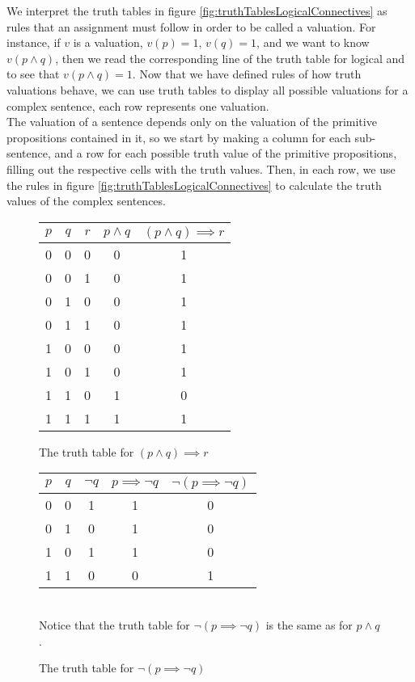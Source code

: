 \documentclass[11pt]{article}
\begin{document}
We interpret the truth tables in figure \ref{fig:truthTablesLogicalConnectives} as rules that an assignment must follow in order to be called a valuation. For instance, if $v$ is a valuation, $v(p) = 1$, $v(q) = 1$, and we want to know $v(p \land q)$, then we read the corresponding line of the truth table for logical and to see that $v(p \land q) = 1$.
\pagebreak
Now that we have defined rules of how truth valuations behave, we can use truth tables to display all possible valuations for a complex sentence, each row represents one valuation. \\ The valuation of a sentence depends only on the valuation of the primitive propositions contained in it, so we start by making a column for each sub-sentence, and a row for each possible truth value of the primitive propositions, filling out the respective cells with the truth values. Then, in each row, we use the rules in figure \ref{fig:truthTablesLogicalConnectives} to calculate the truth values of the complex sentences.
\begin{figure}[H]
    \caption{The truth table for $(p \wedge q) \implies r$}
    \label{fig:TruthTableEg1}
    \centering
    \begin{tabular}{|c|c|c|c|c|}
        \hline
        $p$ & $q$ & $r$ & $p \wedge q$ & $(p \wedge q) \implies r $\\ \hline
        0 & 0 & 0 & 0 & 1 \\
        0 & 0 & 1 & 0 & 1 \\
        0 & 1 & 0 & 0 & 1 \\
        0 & 1 & 1 & 0 & 1 \\
        1 & 0 & 0 & 0 & 1 \\
        1 & 0 & 1 & 0 & 1 \\
        1 & 1 & 0 & 1 & 0 \\
        1 & 1 & 1 & 1 & 1 \\ \hline
    \end{tabular}
\end{figure}
\begin{figure}[H]
    \caption{The truth table for $\neg(p \implies \neg q)$}
    \label{fig:TruthTableEg2}
    \centering
    \begin{tabular}{|c|c|c|c|c|}
        \hline
        $p$ & $q$ & $\neg q$ & $p \implies \neg q$ & $\neg(p \implies \neg q)$ \\ \hline
        0 & 0 & 1 & 1 & 0 \\
        0 & 1 & 0 & 1 & 0\\
        1 & 0 & 1 & 1 & 0 \\
        1 & 1 & 0 & 0 & 1\\ \hline
    \end{tabular}
    \vspace{10pt}\\ Notice that the truth table for $\neg(p \implies \neg q)$ is the same as for $p \land q$.
\end{figure}
\end{document}
